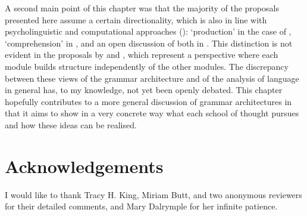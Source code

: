 \documentclass[output=paper,hidelinks]{langscibook}
\begin{document}
A second main point of this chapter was that the majority of the proposals presented here assume a certain directionality, which is also in line with psycholinguistic and computational approaches (): %
`production' in the case of \citet{buttking98}, `comprehension' in \citet{boegeletal09, boegel-etal2010, Oconnor2005}, and an open discussion of both in \citet{Boegel2015}. This distinction is not evident in the proposals by \citet{DM11} and \citet{MycockLowe2013}, which represent a perspective where each module builds structure independently of the other modules. The discrepancy between these views of the grammar architecture and of the analysis of language in general has, to my knowledge, not yet been openly debated. This chapter hopefully contributes to a more general discussion of grammar architectures in that it aims to show in a very concrete way what each school of thought pursues and how these ideas can be realised.


\section*{Acknowledgements}
I would like to thank Tracy H. King, Miriam Butt, and two anonymous reviewers for their detailed comments, and Mary Dalrymple for her infinite patience.

\newpage
\sloppy
\printbibliography[heading=subbibliography,notkeyword=this]
\end{document}
